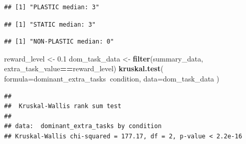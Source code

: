 \documentclass[]{book}
\newenvironment{Shaded}{\begin{snugshade}}{\end{snugshade}}
\newcommand{\DataTypeTok}[1]{\textcolor[rgb]{0.13,0.29,0.53}{#1}}
\newcommand{\FloatTok}[1]{\textcolor[rgb]{0.00,0.00,0.81}{#1}}
\newcommand{\KeywordTok}[1]{\textcolor[rgb]{0.13,0.29,0.53}{\textbf{#1}}}
\newcommand{\NormalTok}[1]{#1}
\newcommand{\OperatorTok}[1]{\textcolor[rgb]{0.81,0.36,0.00}{\textbf{#1}}}
\newcommand{\StringTok}[1]{\textcolor[rgb]{0.31,0.60,0.02}{#1}}
\begin{document}
\begin{verbatim}
## [1] "PLASTIC median: 3"
\end{verbatim}

\begin{Shaded}
\end{Shaded}

\begin{verbatim}
## [1] "STATIC median: 3"
\end{verbatim}

\begin{Shaded}
\end{Shaded}

\begin{verbatim}
## [1] "NON-PLASTIC median: 0"
\end{verbatim}

\begin{Shaded}
\begin{Highlighting}[]
\NormalTok{reward_level <-}\StringTok{ }\FloatTok{0.1}
\NormalTok{dom_task_data <-}\StringTok{ }\KeywordTok{filter}\NormalTok{(summary_data, extra_task_value}\OperatorTok{==}\NormalTok{reward_level)}
\KeywordTok{kruskal.test}\NormalTok{(}
  \DataTypeTok{formula=}\NormalTok{dominant_extra_tasks}\OperatorTok{~}\NormalTok{condition,}
  \DataTypeTok{data=}\NormalTok{dom_task_data}
\NormalTok{)}
\end{Highlighting}
\end{Shaded}

\begin{verbatim}
## 
##  Kruskal-Wallis rank sum test
## 
## data:  dominant_extra_tasks by condition
## Kruskal-Wallis chi-squared = 177.17, df = 2, p-value < 2.2e-16
\end{verbatim}
\end{document}
